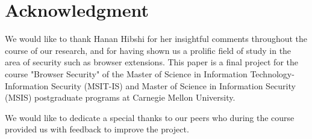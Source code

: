 \documentclass[conference]{IEEEtran}
\begin{document}
\section*{Acknowledgment}
We would like to thank Hanan Hibshi for her insightful comments throughout the course of our research, and for having shown us a prolific field of study in the area of security such as browser extensions. This paper is a final project for the course "Browser Security" of the Master of Science in Information Technology-Information Security (MSIT-IS) and Master of Science in Information Security (MSIS) postgraduate programs at Carnegie Mellon University. 

We would like to dedicate a special thanks to our peers who during the course provided us with feedback to improve the project.



\end{document}
